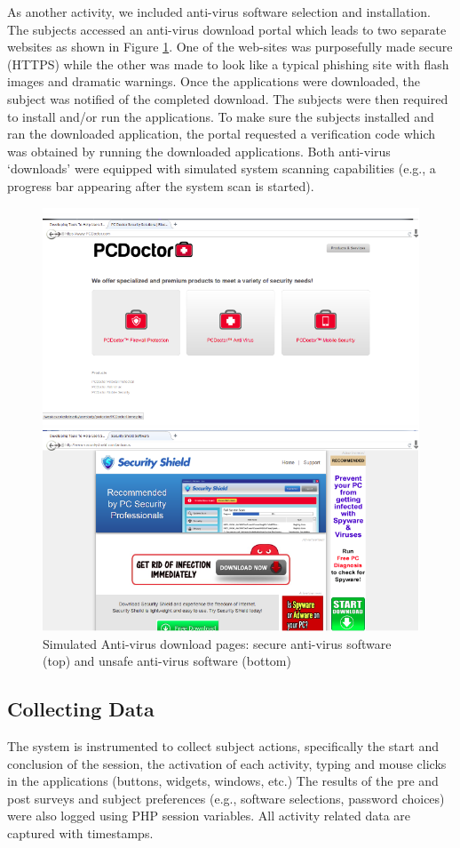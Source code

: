 \documentclass[doctor]{thesis} %
\theoremstyle{plain}
\begin{document}
As another activity, we included anti-virus software selection and installation. The subjects accessed an anti-virus download portal which leads to two separate websites as shown in Figure \ref{fig:virus}. One of the web-sites was purposefully made secure (HTTPS) while the other was made to look like a typical phishing site with flash images and dramatic warnings. Once the applications were downloaded, the subject was notified of the completed download. The subjects were then required to install and/or run the applications. To make sure the subjects installed and ran the downloaded application, the portal requested a verification code which was obtained by running the downloaded applications. Both anti-virus `downloads' were equipped with simulated system scanning capabilities (e.g., a progress bar appearing after the system scan is started).
\begin{figure}[htb]
  \centering
\includegraphics[width=0.7\columnwidth, keepaspectratio=true]{img/virus.png}
  \caption{Simulated Anti-virus download pages: secure anti-virus software (top) and unsafe anti-virus software (bottom)}
  \label{fig:virus}
\end{figure}


\subsection*{Collecting Data}
The system is instrumented to collect subject actions, specifically the start and conclusion of the session, the activation of each activity, typing and mouse clicks in the applications (buttons, widgets, windows, etc.) The results of the pre and post surveys and subject preferences (e.g., software selections, password choices) were also logged using PHP session variables. All activity related data are captured with timestamps.
\end{document}
